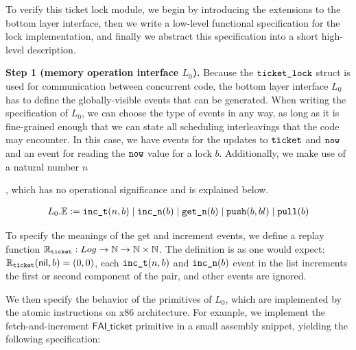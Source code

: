 {To verify this ticket lock module,
we begin by 
introducing the extensions to the bottom layer interface,
then we write a
low-level functional specification for the lock implementation,
and finally we abstract this specification into a short
high-level description.


\noindent\textbf{Step 1 (memory operation interface $L_0$).}
Because the $\comm{ticket\_lock}$ struct is used for communication
between concurrent code, 
the bottom layer interface $L_0$
has to define the globally-visible events that can be generated. 
When writing the specification of $L_0$,  we can choose the type of events in any way, as long
as it is 
fine-grained enough that we can state all scheduling interleavings that
the code may encounter. In this case, we have events for the updates to
$\ticket$ and $\now$ and an event for reading the $\now$ value
for a lock $b$. Additionally, we make use of a natural number 
$n$, which has no
operational significance and is explained below.
\begin{small} 
\[
\begin{array}{c}
L_0.\Ev := \incticket(n, b) \mid \incnow(b) \mid \getnow(b)
\mid \push(b,bl) \mid \pull(b)
\ignore{\\
&  \mid &  \holdlock \mid \tshared (e : \mathsf{SharedMemEvent})}
\end{array}
\] 
\vspace{-10pt}
\end{small}%

To specify the meanings of the get and increment events, we define a replay
function $\replay_{\comm{ticket}} : Log \to \integer \to \integer\times \integer$. 
The definition is as one would expect:
$\replay_{\comm{ticket}}(\mathsf{nil}, b) = (0,0)$, each 
$\incticket(n, b)$ and $\incnow(b)$ event in the list increments
the first or second component of the pair, and other events are ignored.

We then specify the behavior of the primitives
of $L_0$, which are implemented by the atomic instructions on x86 architecture. 
For example, we implement the
fetch-and-increment $\mathsf{FAI\_ticket}$ primitive in a small 
assembly snippet, yielding the following specification:
\begin{small}
\begin{mathpar}
\end{mathpar}
\vspace{-5pt}
\end{small}%

}
